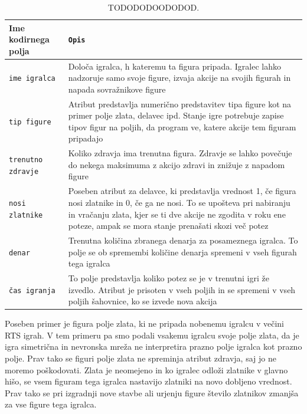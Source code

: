 \documentclass[a4paper, 12pt]{book}
\begin{document}
\begin{table}
	\begin{center}
		\begin{tabular}{p{0.2\linewidth}|p{0.8\linewidth}}
			Ime kodirnega polja    & {\tt Opis} \\ \hline
			{\tt ime igralca}      & Določa igralca, h kateremu ta figura pripada. 
									 Igralec lahko nadzoruje samo svoje figure, izvaja akcije na svojih figurah in napada sovražnikove figure \\
			{\tt tip figure}       & Atribut predstavlja numerično predstavitev tipa figure kot na primer polje zlata, delavec ipd.
									 Stanje igre potrebuje zapise tipov figur na poljih, da program ve, katere akcije tem figuram pripadajo\\
			{\tt trenutno zdravje} & Koliko zdravja ima trenutna figura. 
									 Zdravje se lahko povečuje do nekega maksimuma z akcijo zdravi in znižuje z napadom figure \\
			{\tt nosi zlatnike}    & Poseben atribut za delavce, ki predstavlja vrednost 1, če figura nosi zlatnike in 0, če ga ne nosi. 
									 To se upošteva pri nabiranju in vračanju zlata, kjer se ti dve akcije ne zgodita v roku ene poteze, ampak se mora stanje prenašati skozi več potez \\
			{\tt denar}            & Trenutna količina zbranega denarja za posameznega igralca. 
									 To polje se ob spremembi količine denarja spremeni v vseh figurah tega igralca \\
			{\tt čas igranja}      & To polje predstavlja koliko potez se je v trenutni igri že izvedlo. 
									 Atribut je prisoten v vseh poljih in se spremeni v vseh poljih šahovnice, ko se izvede nova akcija \\
		\end{tabular}
	\end{center}
	\caption{TODODODOODODOD.}
	\label{tableEncoders}
\end{table}


Poseben primer je figura polje zlata, ki ne pripada nobenemu igralcu v večini RTS igrah. 
V tem primeru pa smo podali vsakemu igralcu svoje polje zlata, da je igra simetrična in nevronska mreža ne interpretira prazno polje igralca kot prazno polje.
Prav tako se figuri polje zlata ne spreminja atribut zdravja, saj jo ne moremo poškodovati. 
Zlata je neomejeno in ko igralec odloži zlatnike v glavno hišo, se vsem figuram tega igralca nastavijo zlatniki na novo dobljeno vrednost. 
Prav tako se pri izgradnji nove stavbe ali urjenju figure število zlatnikov zmanjša za vse figure tega igralca.
\end{document}
